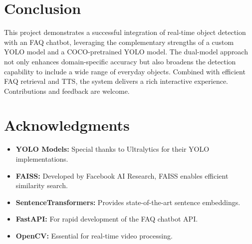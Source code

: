 \documentclass[12pt]{article}
\begin{document}
\section{Conclusion}

This project demonstrates a successful integration of real-time object detection with an FAQ chatbot, leveraging the complementary strengths of a custom YOLO model and a COCO-pretrained YOLO model. The dual-model approach not only enhances domain-specific accuracy but also broadens the detection capability to include a wide range of everyday objects. Combined with efficient FAQ retrieval and TTS, the system delivers a rich interactive experience. Contributions and feedback are welcome.

\section*{Acknowledgments}

\begin{itemize}
    \item \textbf{YOLO Models:} Special thanks to Ultralytics for their YOLO implementations.
    \item \textbf{FAISS:} Developed by Facebook AI Research, FAISS enables efficient similarity search.
    \item \textbf{SentenceTransformers:} Provides state-of-the-art sentence embeddings.
    \item \textbf{FastAPI:} For rapid development of the FAQ chatbot API.
    \item \textbf{OpenCV:} Essential for real-time video processing.
\end{itemize}
\end{document}
